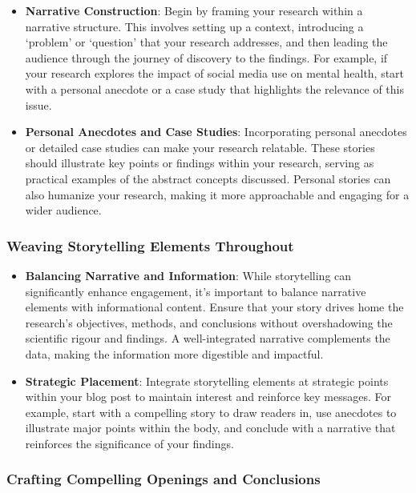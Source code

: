 \documentclass[
]{book}
\begin{document}
\begin{itemize}
\item
  \textbf{Narrative Construction}: Begin by framing your research within a narrative structure. This involves setting up a context, introducing a `problem' or `question' that your research addresses, and then leading the audience through the journey of discovery to the findings. For example, if your research explores the impact of social media use on mental health, start with a personal anecdote or a case study that highlights the relevance of this issue.
\item
  \textbf{Personal Anecdotes and Case Studies}: Incorporating personal anecdotes or detailed case studies can make your research relatable. These stories should illustrate key points or findings within your research, serving as practical examples of the abstract concepts discussed. Personal stories can also humanize your research, making it more approachable and engaging for a wider audience.
\end{itemize}

\hypertarget{weaving-storytelling-elements-throughout}{%
\subsubsection{Weaving Storytelling Elements Throughout}\label{weaving-storytelling-elements-throughout}}

\begin{itemize}
\item
  \textbf{Balancing Narrative and Information}: While storytelling can significantly enhance engagement, it's important to balance narrative elements with informational content. Ensure that your story drives home the research's objectives, methods, and conclusions without overshadowing the scientific rigour and findings. A well-integrated narrative complements the data, making the information more digestible and impactful.
\item
  \textbf{Strategic Placement}: Integrate storytelling elements at strategic points within your blog post to maintain interest and reinforce key messages. For example, start with a compelling story to draw readers in, use anecdotes to illustrate major points within the body, and conclude with a narrative that reinforces the significance of your findings.
\end{itemize}

\hypertarget{crafting-compelling-openings-and-conclusions}{%
\subsubsection{Crafting Compelling Openings and Conclusions}\label{crafting-compelling-openings-and-conclusions}}
\end{document}
